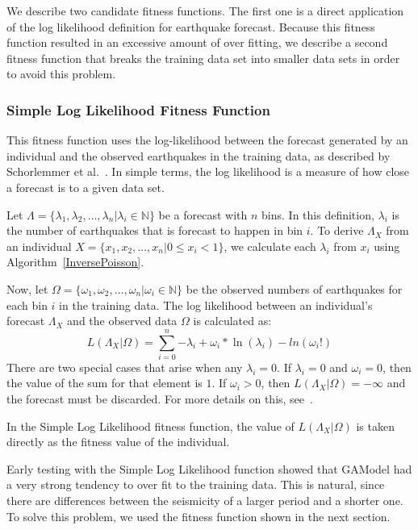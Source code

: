 \documentclass[a4paper,twoside]{article}
\begin{document}
We describe two candidate fitness functions. The first one is a direct
application of the log likelihood definition for earthquake
forecast. Because this fitness function resulted in an excessive
amount of over fitting, we describe a second fitness function that
breaks the training data set into smaller data sets in order to avoid
this problem.

\subsubsection{Simple Log Likelihood Fitness Function} 

This fitness function uses the log-likelihood between the forecast
generated by an individual and the observed earthquakes in the
training data, as described by Schorlemmer et
al.~\cite{Schorlemmer2007}. In simple terms, the log likelihood is a
measure of how close a forecast is to a given data set.

Let $\Lambda = \{\lambda_1, \lambda_2, \dots, \lambda_n | \lambda_i
\in \mathbb{N}\}$ be a forecast with $n$ bins. In this definition,
$\lambda_i$ is the number of earthquakes that is forecast to happen in
bin $i$. To derive $\Lambda_X$ from an individual $X = \{x_1, x_2,
\dots, x_n | 0 \leq x_i < 1\}$, we calculate each $\lambda_i$ from
$x_i$ using Algorithm~\ref{InversePoisson}.

Now, let $\Omega = \{\omega_1, \omega_2, \dots, \omega_n | \omega_i
\in \mathbb{N}\}$ be the observed numbers of earthquakes for each bin
$i$ in the training data. The log likelihood between an individual's
forecast $\Lambda_X$ and the observed data $\Omega$ is calculated as:
\begin{equation}
  L(\Lambda_X|\Omega) = \sum_{i=0}^n {-\lambda_i +
    \omega_i*\ln(\lambda_i)-ln(\omega_i!)}
\end{equation}
There are two special cases that arise when any $\lambda_i = 0$. If
$\lambda_i = 0$ and $\omega_i = 0$, then the value of the sum for that
element is $1$. If $\omega_i > 0$, then $L(\Lambda_X|\Omega) =
-\infty$ and the forecast must be discarded. For more details on
this, see~\cite{Schorlemmer2007}.

In the Simple Log Likelihood fitness function, the value of
$L(\Lambda_X|\Omega)$ is taken directly as the fitness value of the
individual.

Early testing with the Simple Log Likelihood function showed that
GAModel had a very strong tendency to over fit to the training
data. This is natural, since there are differences between the
seismicity of a larger period and a shorter one. To solve this
problem, we used the fitness function shown in the next section.
\end{document}
